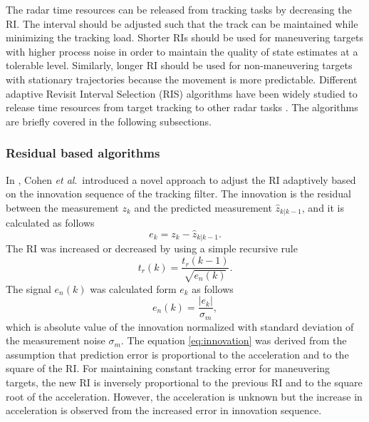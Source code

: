 \documentclass[english, 12pt, a4paper, elec, utf8, a-1b, online]{aaltothesis}
\newcommand{\etal}{\textit{et al}.~}
\begin{document}
The radar time resources can be released from tracking tasks by decreasing the RI. 
The interval should be adjusted such that the track can be maintained while minimizing the tracking load.
Shorter RIs should be used for maneuvering targets with higher process noise in order to maintain the quality of state estimates at a tolerable level. 
Similarly, longer RI should be used for non-maneuvering targets with stationary trajectories because the movement is more predictable.
Different adaptive Revisit Interval Selection (RIS) algorithms have been widely studied to release time resources from target tracking to other radar tasks \cite{Cohen1986, Gardner1988, Munu1992, ChengTing2007, Baek2010, Watson1993, Charlish2015, Keuk1975, Shin1995, Benoudnine2006}.
The algorithms are briefly covered in the following subsections.

\subsubsection{Residual based algorithms}

In \cite{Cohen1986}, Cohen \etal introduced a novel approach to adjust the RI adaptively based on the innovation sequence of the tracking filter.
The innovation is the residual between the measurement $z_k$ and the predicted measurement $\hat{z}_{k|k-1}$, and it is calculated as follows
\begin{equation}\label{eq:innovation}
    e_k = z_k - \hat{z}_{k|k-1}.
\end{equation}
The RI was increased or decreased by using a simple recursive rule 
\begin{equation}\label{eq:update_resid}
    t_r(k) = \frac{t_r(k-1)}{\sqrt{e_n(k)}}.
\end{equation}
The signal $e_n(k)$ was calculated form $e_k$ as follows
\begin{equation}\label{eq:norm_residual}
    e_n(k) = \frac{|e_k|}{\sigma_m},
\end{equation}
which is absolute value of the innovation normalized with standard deviation of the measurement noise $\sigma_m$.
The equation \eqref{eq:innovation} was derived from the assumption that prediction error is proportional to the acceleration and to the square of the RI.
For maintaining constant tracking error for maneuvering targets, the new RI is inversely proportional to the previous RI and to the square root of the acceleration.
However, the acceleration is unknown but the increase in acceleration is observed from the increased error in innovation sequence.
\end{document}
